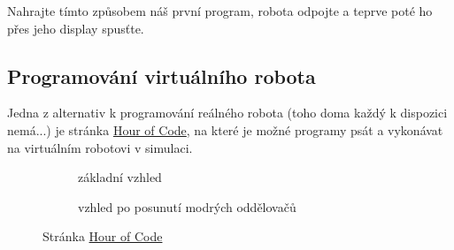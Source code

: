 \documentclass[main.tex]{subfiles}
\begin{document}
	\begin{question}
		Nahrajte tímto způsobem náš první program, robota odpojte a teprve poté ho přes jeho display spusťte.
	\end{question}

	\subsection{Programování virtuálního robota}
	Jedna z alternativ k programování reálného robota (toho doma každý k dispozici nemá...) je stránka \href{http://www.robotmesh.com/create/176384}{Hour of Code}, na které je možné programy psát a vykonávat na virtuálním robotovi v simulaci.

	\begin{figure}[h!]%
		\begin{subfigure}{.49\textwidth}%
			\centering%
			\caption{základní vzhled}%
		\end{subfigure} \hspace{.05\textwidth}%
		\begin{subfigure}{.49\textwidth}%
			\centering%
			\caption{vzhled po posunutí modrých oddělovačů}%
		\end{subfigure}%
		\caption{Stránka \href{http://www.robotmesh.com/create/176384}{Hour of Code}}
	\end{figure}
\end{document}
